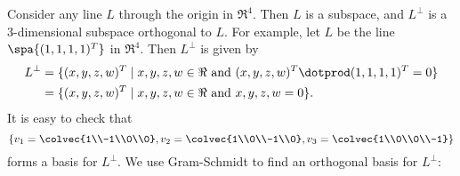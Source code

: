 
\begin{example}
Consider any line \(L\) through the origin in \(\Re^4\). Then \(L\) is a subspace, and \(L^\perp\) is a \(3\)-dimensional subspace orthogonal to \(L\). For example, let \(L\) be the line 
$\spa \{ (1,1,1,1)^T\}$ in \(\Re^4.\) Then \(L^\perp\) is given by
\begin{align*}
L^\perp&=\{(x,y,z,w)^T \mid x,y,z,w \in \Re \text{ and } (x,y,z,w)^T \dotprod (1,1,1,1)^T=0\} \\
&=\{(x,y,z,w)^T \mid x,y,z,w \in \Re \text{ and } x,y,z,w=0\}.
\end{align*}
It is easy to check that 
\[
\left\{
v_1=\colvec{1\\-1\\0\\0}, v_2=\colvec{1\\0\\-1\\0}, v_3=\colvec{1\\0\\0\\-1} \right \}
\] 
forms a basis for \(L^\perp\). We use Gram-Schmidt to find an orthogonal basis for \(L^\perp\):


\end{example}
